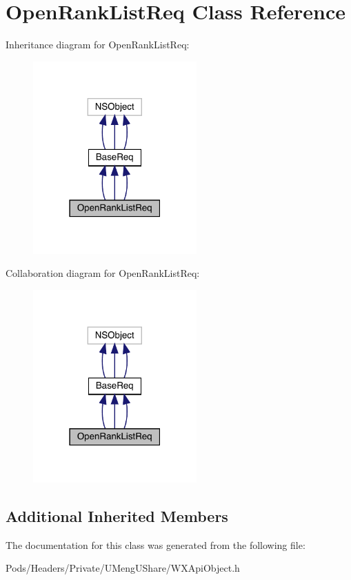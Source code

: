 \hypertarget{interface_open_rank_list_req}{}\section{Open\+Rank\+List\+Req Class Reference}
\label{interface_open_rank_list_req}


Inheritance diagram for Open\+Rank\+List\+Req\+:\nopagebreak
\begin{figure}[H]
\begin{center}
\leavevmode
\includegraphics[width=178pt]{interface_open_rank_list_req__inherit__graph}
\end{center}
\end{figure}


Collaboration diagram for Open\+Rank\+List\+Req\+:\nopagebreak
\begin{figure}[H]
\begin{center}
\leavevmode
\includegraphics[width=178pt]{interface_open_rank_list_req__coll__graph}
\end{center}
\end{figure}
\subsection*{Additional Inherited Members}


The documentation for this class was generated from the following file\+:\begin{DoxyCompactItemize}
\item 
Pods/\+Headers/\+Private/\+U\+Meng\+U\+Share/W\+X\+Api\+Object.\+h\end{DoxyCompactItemize}
